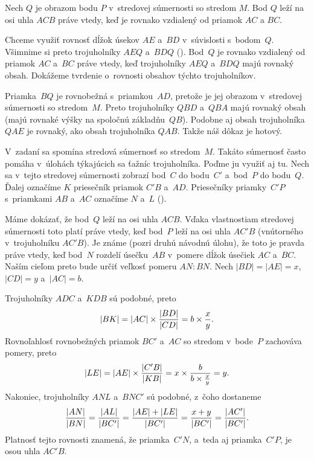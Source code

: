 {%
Nech $Q$ je obrazom bodu $P$ v~stredovej súmernosti so stredom $M$.
Bod $Q$ leží na osi uhla $ACB$ práve vtedy, keď je rovnako vzdialený od priamok $AC$ a $BC$.
%

Chceme využiť rovnosť dĺžok úsekov $AE$ a~$BD$ v~súvislosti s~bodom~$Q$. Všimnime si preto trojuholníky $AEQ$ a~$BDQ$ (\obr). Bod~$Q$ je rovnako vzdialený od priamok $AC$ a~$BC$ práve vtedy, keď trojuholníky $AEQ$ a~$BDQ$ majú rovnaký obsah. Dokážeme tvrdenie o~rovnosti obsahov týchto trojuholníkov.

Priamka~$BQ$ je rovnobežná s~priamkou~$AD$, pretože je jej obrazom v~stredovej súmernosti so stredom~$M$.
Preto trojuholníky $QBD$ a~$QBA$ majú rovnaký obsah (majú rovnaké výšky na spoločnú základňu~$QB$).
Podobne aj obsah trojuholníka $QAE$ je rovnaký, ako obsah trojuholníka $QAB$. Takže náš dôkaz je hotový.

%

\ineriesenie
V~zadaní sa spomína stredová súmernosť so stredom~$M$. Takáto súmernosť často pomáha v~úlohách týkajúcich sa ťažníc trojuholníka. Poďme ju využiť aj tu. Nech sa v~tejto stredovej súmernosti zobrazí bod~$C$ do bodu~$C'$ a~bod~$P$ do bodu~$Q$. Ďalej označíme $K$ priesečník priamok $C'B$ a~$AD$. Priesečníky priamky~$C'P$ s~priamkami $AB$ a~$AC$ označíme $N$ a~$L$ (\obr).
%

Máme dokázať, že bod~$Q$ leží na osi uhla $ACB$. Vďaka vlastnostiam stredovej súmernosti toto platí práve vtedy, keď bod~$P$ leží na osi uhla $AC'B$ (vnútorného v~trojuholníku $AC'B$). Je známe (pozri druhú návodnú úlohu), že toto je pravda práve vtedy, keď bod~$N$ rozdelí úsečku~$AB$ v~pomere dĺžok úsečiek $AC$ a~$BC$.
Naším cieľom preto bude určiť veľkosť pomeru $AN:BN$. Nech $|BD|=|AE|=x$, $|CD|=y$ a~$|AC|=b$.

Trojuholníky $ADC$ a~$KDB$ sú podobné, preto
$$
|BK|=|AC|\cdot{|BD|\over |CD|}=b\cdot {x\over y}.
$$
Rovnoľahlosť rovnobežných priamok $BC'$ a~$AC$ so stredom v~bode~$P$ zachováva pomery, preto
$$
|LE|=|AE|\cdot{|C'B|\over |KB|}=x\cdot {b\over b\cdot {x\over y}}=y.
$$
Nakoniec, trojuholníky $ANL$ a~$BNC'$ sú podobné, z~čoho dostaneme
$$
{|AN|\over |BN|}={|AL|\over |BC'|}={|AE|+|LE|\over |BC'|}={x+y\over |BC'|}={|AC'|\over |BC'|}.
$$
Platnosť tejto rovnosti znamená, že priamka~$C'N$, a~teda aj priamka~$C'P$, je osou uhla $AC'B$.


}
